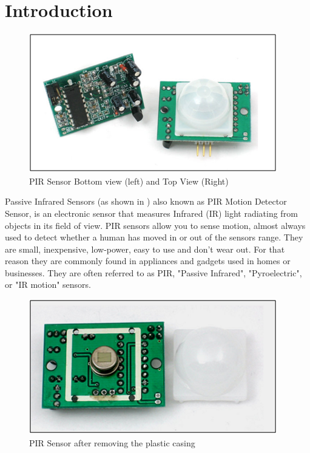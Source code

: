 \documentclass[a4paper,12 pt]{article}
\begin{document}
\section{Introduction} 
\vspace {5 mm}
\begin{figure}[h]
\begin{center}
\includegraphics[]{PIR_Sensor.png}
\caption{PIR Sensor Bottom view (left) and Top View (Right)}
\label{fig:1}
\end{center}
\end{figure}
\vspace{-20 pt}
 Passive Infrared Sensors (as shown in ) also known as PIR Motion Detector Sensor, is an electronic sensor that measures Infrared (IR) light radiating from objects in its field of view. PIR sensors allow you to sense motion, almost always used to detect whether a human has moved in or out of the sensors range. They are small, inexpensive, low-power, easy to use and don't wear out. For that reason they are commonly found in appliances and gadgets used in homes or businesses. They are often referred to as PIR, "Passive Infrared", "Pyroelectric", or "IR motion" sensors.


\begin{figure}[h]
\begin{center}
\includegraphics[]{PIR_Sensor_2.png}
\caption{PIR Sensor after removing the plastic casing}
\label{fig:2}
\end{center}
\end{figure}
\end{document}
